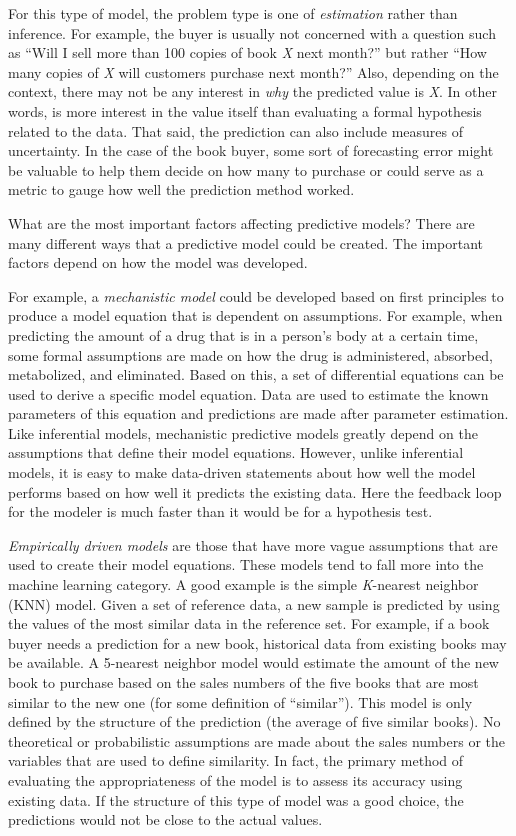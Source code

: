 \documentclass[11pt]{book}
\begin{document}
For this type of model, the problem type is one of \emph{estimation} rather than inference. For example, the buyer is usually not concerned with a question such as ``Will I sell more than 100 copies of book \emph{X} next month?'' but rather ``How many copies of \emph{X} will customers purchase next month?'' Also, depending on the context, there may not be any interest in \emph{why} the predicted value is \emph{X}. In other words, is more interest in the value itself than evaluating a formal hypothesis related to the data. That said, the prediction can also include measures of uncertainty. In the case of the book buyer, some sort of forecasting error might be valuable to help them decide on how many to purchase or could serve as a metric to gauge how well the prediction method worked.

What are the most important factors affecting predictive models? There are many different ways that a predictive model could be created. The important factors depend on how the model was developed.

For example, a \emph{mechanistic model} could be developed based on first principles to produce a model equation that is dependent on assumptions. For example, when predicting the amount of a drug that is in a person's body at a certain time, some formal assumptions are made on how the drug is administered, absorbed, metabolized, and eliminated. Based on this, a set of differential equations can be used to derive a specific model equation. Data are used to estimate the known parameters of this equation and predictions are made after parameter estimation. Like inferential models, mechanistic predictive models greatly depend on the assumptions that define their model equations. However, unlike inferential models, it is easy to make data-driven statements about how well the model performs based on how well it predicts the existing data. Here the feedback loop for the modeler is much faster than it would be for a hypothesis test.

\emph{Empirically driven models} are those that have more vague assumptions that are used to create their model equations. These models tend to fall more into the machine learning category. A good example is the simple \emph{K}-nearest neighbor (KNN) model. Given a set of reference data, a new sample is predicted by using the values of the most similar data in the reference set. For example, if a book buyer needs a prediction for a new book, historical data from existing books may be available. A 5-nearest neighbor model would estimate the amount of the new book to purchase based on the sales numbers of the five books that are most similar to the new one (for some definition of ``similar''). This model is only defined by the structure of the prediction (the average of five similar books). No theoretical or probabilistic assumptions are made about the sales numbers or the variables that are used to define similarity. In fact, the primary method of evaluating the appropriateness of the model is to assess its accuracy using existing data. If the structure of this type of model was a good choice, the predictions would not be close to the actual values.
\end{document}
